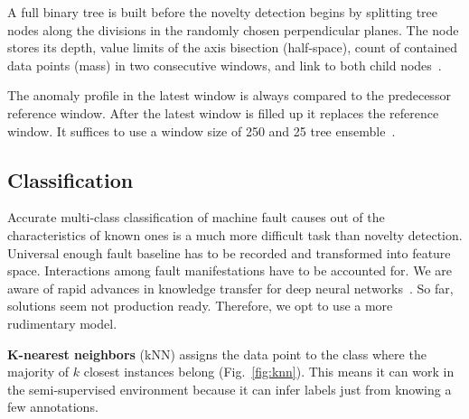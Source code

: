 A full binary tree is built before the novelty detection begins by splitting tree nodes along the divisions in the randomly chosen perpendicular planes. The node stores its depth, value limits of the axis bisection (half-space), count of contained data points (mass) in two consecutive windows, and link to both child nodes~\cite{tan_fast_2011}. 

The anomaly profile in the latest window is always compared to the predecessor reference window. After the latest window is filled up it replaces the reference window. It suffices to use a window size of 250 and 25 tree ensemble~\cite{tan_fast_2011}.

\subsection{Classification}

Accurate multi-class classification of machine fault causes out of the characteristics of known ones is a much more difficult task than novelty detection. Universal enough fault baseline has to be recorded and transformed into feature space. Interactions among fault manifestations have to be accounted for. We are aware of rapid advances in knowledge transfer for deep neural networks~\cite{maurya_condition-based_2021}. So far, solutions seem not production ready. Therefore, we opt to use a more rudimentary model.
\bigbreak

\textbf{K-nearest neighbors} (kNN) assigns the data point to the class where the majority of $k$ closest instances belong (Fig.~\ref{fig:knn}). This means it can work in the semi-supervised environment because it can infer labels just from knowing a few annotations.

